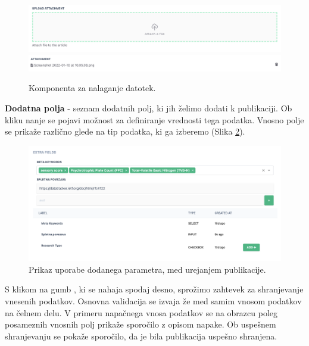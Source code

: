 \documentclass[a4paper, 12pt]{book}
\begin{document}
\begin{description}
    \begin{figure}[h]
    \begin{center}
        \includegraphics[width=1\textwidth]{slike/upload_file_zone.png}
        \includegraphics[width=1\textwidth]{slike/upload_file_list.png}
        \end{center}
        \caption{ Komponenta za nalaganje datotek. }
        \label{type-fileupload}
    \end{figure}
  
    \item \textbf{Dodatna polja} - seznam dodatnih polj, ki jih želimo dodati k publikaciji. Ob kliku nanje se pojavi možnost za definiranje vrednosti tega podatka. Vnosno polje se prikaže različno glede na tip podatka, ki ga izberemo (Slika \ref{fields-usage}).
    \begin{figure}[h]
        \begin{center}
        \includegraphics[width=1\textwidth]{slike/fields_usage.png}
        \end{center}
        \caption{ Prikaz uporabe dodanega parametra, med urejanjem publikacije. }
        \label{fields-usage}
    \end{figure}
   
\end{description}

S klikom na gumb , ki se nahaja spodaj desno, sprožimo zahtevek za shranjevanje vnesenih podatkov. Osnovna validacija se izvaja že med samim vnosom podatkov na čelnem delu. V primeru napačnega vnosa podatkov se na obrazcu poleg posameznih vnosnih polj prikaže sporočilo z opisom napake. Ob uspešnem shranjevanju se pokaže sporočilo, da je bila publikacija uspešno shranjena. 
\end{document}
